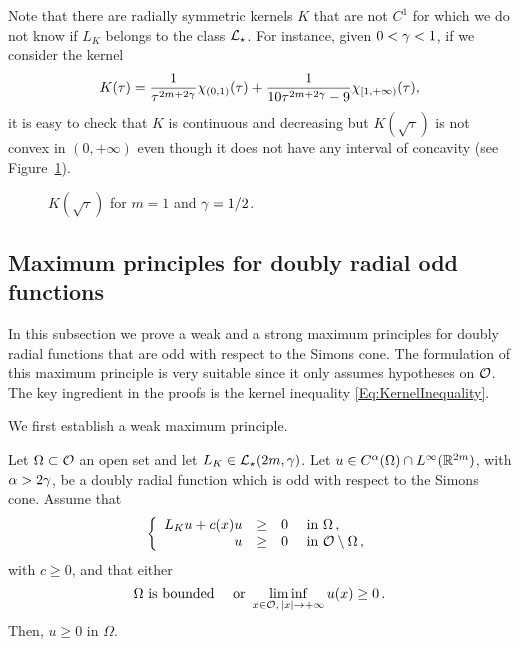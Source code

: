 \begin{remark}
	Note that there are radially symmetric kernels $K$ that are not $C^1$ for which we do not know if $L_K$ belongs to the class $\mathcal{L}_\star$. For instance, given $0<\gamma<1$, if we consider the kernel
	$$ K(\tau) = \frac{1}{\tau^{2m+2\gamma}} \chi_{(0,1)}(\tau)+\frac{1}{10\tau^{2m+2\gamma}-9} \chi_{[1,+\infty)}(\tau), $$
	it is easy to check that $K$ is continuous and decreasing but $K(\sqrt{\tau})$ is not convex in $(0,+\infty)$ even though it does not have any interval of concavity (see Figure~\ref{Fig:Grafica}).
	\begin{figure}
	\centering
	\caption{$K(\sqrt{\tau})$ for $m=1$ and $\gamma=1/2$.}
	\label{Fig:Grafica}
	\end{figure}
\end{remark}

\subsection{Maximum principles for doubly radial odd functions}

In this subsection we prove a weak and a strong maximum principles for doubly radial functions that are odd with respect to the Simons cone. The formulation of this maximum principle is very suitable since it only assumes hypotheses on $\mathcal{O}$. The key ingredient in the proofs is the kernel inequality \eqref{Eq:KernelInequality}.


We first establish a weak maximum principle.

\begin{proposition}
\label{Prop:WeakMaximumPrincipleForOddFunctions} Let $\Omega \subset \mathcal{O}$ an open set and let $L_K  \in \mathcal{L}_\star (2m,  \gamma)$.  Let $u\in C^{\alpha}(\Omega)\cap L^\infty(\mathbb{R}^{2m})$, with $\alpha > 2\gamma$, be a doubly radial function which is odd with respect to the Simons cone. Assume that
$$
\left\{\begin{array}{rcll}
L_K u + c(x) u & \geq & 0 & \text{ in } \Omega\,,\\
u & \geq & 0 & \text{ in } \mathcal{O} \setminus \Omega\,,
\end{array} \right.
$$
with $c \geq 0$, and that either
$$
\Omega \text{ is bounded} \quad \text{ or } \liminf_{x \in \mathcal{O},\,|x|\to +\infty} u(x) \geq 0\,.
$$
Then, $u \geq 0$ in $\Omega$.
\end{proposition}

